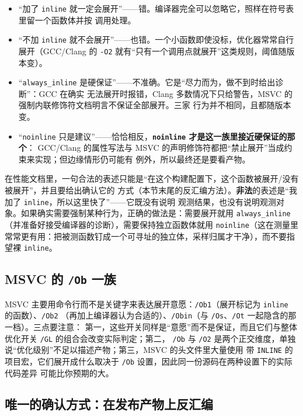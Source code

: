\documentclass[12pt,a4paper,fontset=fandol]{ctexbook}
\newcommand{\Tp}[1]{\texttt{#1}}
\newcommand{\Bk}{\discretionary{}{}{}}
\begin{document}
\begin{itemize}
  \item ``加了 \Tp{inline} 就一定会展开''——错。编译器完全可以忽略它，照样在符号表里留一个函数体并按
        调用处理。
  \item ``不加 \Tp{inline} 就不会展开''——也错。一个小函数即使没标，优化器常常自行展开（GCC/Clang 的
        \Tp{-O2} 就有``只有一个调用点就展开''这类规则，阈值随版本变）。
  \item ``\Tp{always\_{\Bk}inline} 是硬保证''——不准确。它是``尽力而为，做不到时给出诊断''：GCC 在确实
        无法展开时报错，Clang 多数情况下只给警告，MSVC 的强制内联修饰符文档明言不保证全部展开。三家
        行为并不相同，且都随版本变。
  \item ``\Tp{noinline} 只是建议''——恰恰相反，\textbf{\Tp{noinline} 才是这一族里接近硬保证的那个}：
        GCC/Clang 的属性写法与 MSVC 的声明修饰符都把``禁止展开''当成约束来实现；但边缘情形仍可能有
        例外，所以最终还是要看产物。
\end{itemize}

\begin{guideline}[title={把内联当成``需要观测的优化器决策''来写结论}]
在性能文档里，一句合法的表述只能是``在这个构建配置下，这个函数被展开/没有被展开''，并且要给出确认它的
方式（本节末尾的反汇编方法）。\textbf{非法}的表述是``我加了 \Tp{inline}，所以这里快了''——它既没有说明
观测结果，也没有说明观测对象。如果确实需要强制某种行为，正确的做法是：需要展开就用
\Tp{always\_{\Bk}inline}（并准备好接受编译器的诊断），需要保持独立函数体就用 \Tp{noinline}（这在测量里
常常更有用：把被测函数钉成一个可寻址的独立体，采样归属才干净），而不要指望裸 \Tp{inline}。
\end{guideline}

\subsection{MSVC 的 \Tp{/Ob} 一族}

MSVC 主要用命令行而不是关键字来表达展开意愿：\Tp{/Ob1}（展开标记为 \Tp{inline} 的函数）、\Tp{/Ob2}
（再加上编译器认为合适的）、\Tp{/Obin}（与 \Tp{/Os}、\Tp{/Ot} 一起隐含的那一档）。三点要注意：
第一，这些开关同样是``意愿''而不是保证，而且它们与整体优化开关 \Tp{/GL} 的组合会改变实际判定；第二，
\Tp{/Ob} 与 \Tp{/O2} 是两个正交维度，单独说``优化级别''不足以描述产物；第三，MSVC 的头文件里大量使用
带 \Tp{INLINE} 的项目宏，它们展开成什么取决于 \Tp{/Ob} 设置，因此同一份源码在两种设置下的实际代码差异
可能比你预期的大。

\subsection{唯一的确认方式：在发布产物上反汇编}
\end{document}
